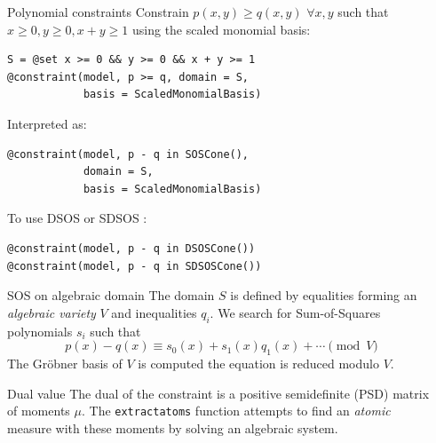 \documentclass[final]{beamer}
\newlength{\sepwid}
\newlength{\onecolwid}
\begin{document}
\begin{frame}[t,fragile]
\begin{columns}[t]
\begin{column}{\onecolwid}
  \begin{block}{Polynomial constraints}
    Constrain $p(x, y) \geq q(x, y)$ $\forall x, y$ such that $x \ge 0, y \ge 0, x + y \ge 1$ using the scaled monomial basis:
\begin{verbatim}
S = @set x >= 0 && y >= 0 && x + y >= 1
@constraint(model, p >= q, domain = S,
            basis = ScaledMonomialBasis)
\end{verbatim}
    Interpreted as:
\begin{verbatim}
@constraint(model, p - q in SOSCone(),
            domain = S,
            basis = ScaledMonomialBasis)
\end{verbatim}
    To use DSOS or SDSOS \cite{ahmadi2017dsos}:
\begin{verbatim}
@constraint(model, p - q in DSOSCone())
@constraint(model, p - q in SDSOSCone())
\end{verbatim}
  \begin{alertblock}{SOS on algebraic domain}
    The domain $S$ is defined by equalities forming an \emph{algebraic variety}
    $V$ and inequalities $q_i$.
    We search for Sum-of-Squares polynomials $s_i$ such that
    \[ p(x) - q(x) \equiv s_0(x) + s_1(x) q_1(x) + \cdots \pmod{V} \]
    The Gr\"obner basis of $V$ is computed the equation is reduced modulo $V$.
  \end{alertblock}
  \end{block}

  \begin{block}{Dual value}
    The dual of the constraint is a positive semidefinite (PSD) matrix of moments $\mu$.
    The \texttt{extractatoms} function attempts to find an \emph{atomic} measure
    with these moments by solving an algebraic system.
  \end{block}
\end{column}

\begin{column}{\sepwid}\end{column} %


\end{columns}
\end{frame}
\end{document}

